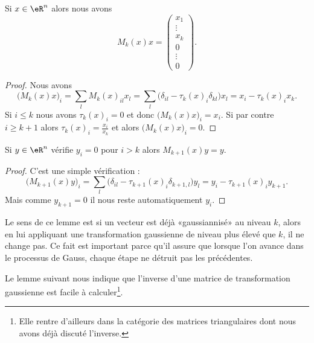 \begin{lemma}
    Si \( x\in \eR^n\) alors nous avons 
    \begin{equation}
        M_k(x)x=\begin{pmatrix}
            x_1    \\ 
            \vdots    \\ 
            x_k    \\ 
            0    \\ 
            \vdots    \\ 
            0    
        \end{pmatrix}.
    \end{equation}
\end{lemma}

\begin{proof}
    Nous avons
    \begin{equation}
        \big( M_k(x)x \big)_i=\sum_lM_k(x)_{il}x_l=\sum_l\big( \delta_{il}-\tau_k(x)_i\delta_{kl} \big)x_l=x_i-\tau_k(x)_ix_k. 
    \end{equation}
    Si \( i\leq k\) nous avons \( \tau_k(x)_i=0\) et donc \(  \big( M_k(x)x \big)_i=x_i   \). Si par contre \( i\geq k+1\) alors \( \tau_k(x)_i=\frac{ x_i }{ x_k }\) et alors \( \big( M_k(x)x \big)_i=0\).
\end{proof}

\begin{lemma}       \label{LEMooPFWWooUmMsVH}
    Si \( y\in \eR^n\) vérifie \( y_i=0\) pour \( i>k\) alors \( M_{k+1}(x)y=y\).
\end{lemma}

\begin{proof}
    C'est une simple vérification :
    \begin{equation}
        \big( M_{k+1}(x)y \big)_i=\sum_l\big( \delta_{il}-\tau_{k+1}(x)_i\delta_{k+1,l} \big)y_l=y_i-\tau_{k+1}(x)_iy_{k+1}.
    \end{equation}
    Mais comme \( y_{k+1}=0\) il nous reste automatiquement \( y_i\).
\end{proof}
Le sens de ce lemme est si un vecteur est déjà «gaussiannisé» au niveau \( k\), alors en lui appliquant une transformation gaussienne de niveau plus élevé que \( k\), il ne change pas. Ce fait est important parce qu'il assure que lorsque l'on avance dans le processus de Gauss, chaque étape ne détruit pas les précédentes.

Le lemme suivant nous indique que l'inverse d'une matrice de transformation gaussienne est facile à calculer\footnote{Elle rentre d'ailleurs dans la catégorie des matrices triangulaires dont nous avons déjà discuté l'inverse.}.

